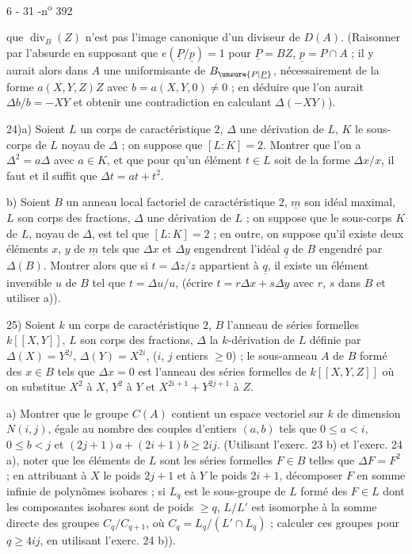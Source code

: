 \begin{center}6 - 31 -\hfill n\textsuperscript{o} 392\end{center}

que $\operatorname{div}_B(Z)$ n'est pas l'image canonique d'un diviseur de $D(A)$. (Raisonner par l'absurde en supposant que $e(\underline{P}/\underline{p})=1$ pour $\underline{P}=BZ$, $\underline{p}=P\cap A$ ; il y aurait alors dans $A$ une uniformisante de $B_{\unsure{P|\underline{P}}}$, nécessairement de la forme $a(X,Y,Z)Z$ avec $b=a(X,Y,0)\ne 0$ ; en déduire que l'on aurait $\Delta b/b=-XY$ et obtenir une contradiction en calculant $\Delta(-XY)$).

24)\quad a) Soient $L$ un corps de caractéristique $2$, $\Delta$ une dérivation de $L$, $K$ le sous-corps de $L$ noyau de $\Delta$ ; on suppose que $[L:K]=2$. Montrer que l'on a $\Delta^2=a\Delta$ avec $a\in K$, et que pour qu'un élément $t\in L$ soit de la forme $\Delta x/x$, il faut et il suffit que $\Delta t=at+t^2$.

b) Soient $B$ un anneau local factoriel de caractéristique $2$, $\underline{m}$ son idéal maximal, $L$ son corps des fractions, $\Delta$ une dérivation de $L$ ; on suppose que le sous-corps $K$ de $L$, noyau de $\Delta$, est tel que $[L:K]=2$ ; en outre, on suppose qu'il existe deux éléments $x$, $y$ de $\underline{m}$ tels que $\Delta x$ et $\Delta y$ engendrent l'idéal $\underline{q}$ de $B$ engendré par $\Delta(B)$. Montrer alors que si $t=\Delta z/z$ appartient à $\underline{q}$, il existe un élément inversible $u$ de $B$ tel que $t=\Delta u/u$, (écrire $t=r\Delta x+s\Delta y$ avec $r$, $s$ dans $B$ et utiliser a)).

25) Soient $k$ un corps de caractéristique $2$, $B$ l'anneau de séries formelles $k[[X,Y]]$, $L$ son corps des fractions, $\Delta$ la $k$-dérivation de $L$ définie par $\Delta(X)=Y^{2j}$, $\Delta(Y)=X^{2i}$, ($i$, $j$ entiers $\geq 0$) ; le sous-anneau $A$ de $B$ formé des $x\in B$ tels que $\Delta x=0$ est l'anneau des séries formelles de $k[[X,Y,Z]]$ où on substitue $X^2$ à $X$, $Y^2$ à $Y$ et $X^{2i+1}+Y^{2j+1}$ à $Z$.

a) Montrer que le groupe $C(A)$ contient un espace vectoriel sur $k$ de dimension $N(i,j)$, égale au nombre des couples d'entiers $(a,b)$ tels que $0\leq a<i$, $0\leq b<j$ et $(2j+1)a+(2i+1)b\geq 2ij$. (Utilisant l'exerc. 23 b) et l'exerc. 24 a), noter que les éléments de $L$ sont les séries formelles $F\in B$ telles que $\Delta F=F^2$ ; en attribuant à $X$ le poids $2j+1$ et à $Y$ le poids $2i+1$, décomposer $F$ en somme infinie de polynômes isobares ; si $L_q$ est le sous-groupe de $L$ formé des $F\in L$ dont les composantes isobares sont de poids $\geq q$, $L/L'$ est isomorphe à la somme directe des groupes $C_q/C_{q+1}$, où $C_q=L_q/(L'\cap L_q)$ ; calculer ces groupes pour $q\geq 4ij$, en utilisant l'exerc. 24 b)).

